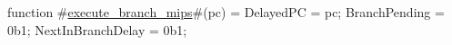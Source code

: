 function #\hyperref[sailMIPSzexecutezybranchzymips]{execute\_branch\_mips}#(pc) = {
  DelayedPC = pc;
  BranchPending = 0b1;
  NextInBranchDelay = 0b1;
}
